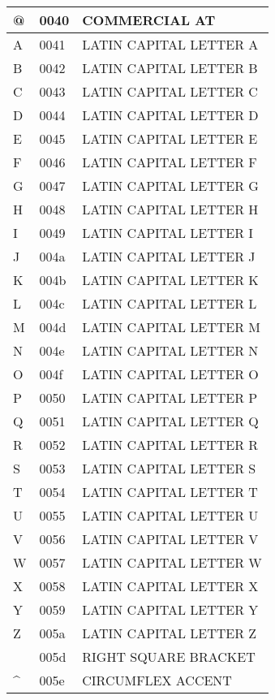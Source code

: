 \documentclass[12pt,letterpaper,openany]{book}
\begin{document}
\begin{center}
\begin{supertabular}{|m{0.25in}|m{0.5in}|m{4in}|}
			@ & 0040 & COMMERCIAL AT\\\hline
			A & 0041 & LATIN CAPITAL LETTER A\\\hline
			B & 0042 & LATIN CAPITAL LETTER B\\\hline
			C & 0043 & LATIN CAPITAL LETTER C\\\hline
			D & 0044 & LATIN CAPITAL LETTER D\\\hline
			E & 0045 & LATIN CAPITAL LETTER E\\\hline
			F & 0046 & LATIN CAPITAL LETTER F\\\hline
			G & 0047 & LATIN CAPITAL LETTER G\\\hline
			H & 0048 & LATIN CAPITAL LETTER H\\\hline
			I & 0049 & LATIN CAPITAL LETTER I\\\hline
			J & 004a & LATIN CAPITAL LETTER J\\\hline
			K & 004b & LATIN CAPITAL LETTER K\\\hline
			L & 004c & LATIN CAPITAL LETTER L\\\hline
			M & 004d & LATIN CAPITAL LETTER M\\\hline
			N & 004e & LATIN CAPITAL LETTER N\\\hline
			O & 004f & LATIN CAPITAL LETTER O\\\hline
			P & 0050 & LATIN CAPITAL LETTER P\\\hline
			Q & 0051 & LATIN CAPITAL LETTER Q\\\hline
			R & 0052 & LATIN CAPITAL LETTER R\\\hline
			S & 0053 & LATIN CAPITAL LETTER S\\\hline
			T & 0054 & LATIN CAPITAL LETTER T\\\hline
			U & 0055 & LATIN CAPITAL LETTER U\\\hline
			V & 0056 & LATIN CAPITAL LETTER V\\\hline
			W & 0057 & LATIN CAPITAL LETTER W\\\hline
			X & 0058 & LATIN CAPITAL LETTER X\\\hline
			Y & 0059 & LATIN CAPITAL LETTER Y\\\hline
			Z & 005a & LATIN CAPITAL LETTER Z\\ & 005d & RIGHT SQUARE BRACKET\\\hline
			\textasciicircum & 005e & CIRCUMFLEX ACCENT\\\hline

\end{supertabular}
\end{center}
\end{document}

